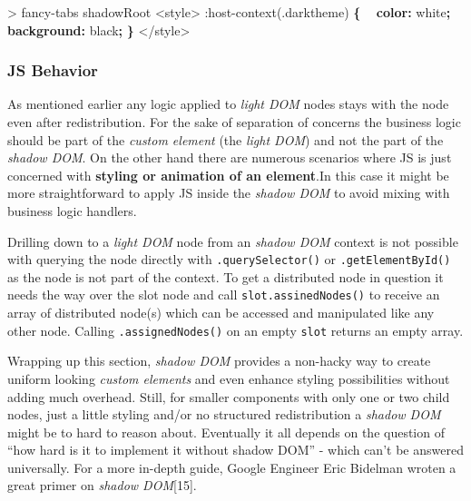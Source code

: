 \documentclass[]{article}
\newenvironment{Shaded}{}{}
\newcommand{\KeywordTok}[1]{\textcolor[rgb]{0.00,0.44,0.13}{\textbf{{#1}}}}
\newcommand{\DataTypeTok}[1]{\textcolor[rgb]{0.56,0.13,0.00}{{#1}}}
\newcommand{\DecValTok}[1]{\textcolor[rgb]{0.25,0.63,0.44}{{#1}}}
\newcommand{\FloatTok}[1]{\textcolor[rgb]{0.25,0.63,0.44}{{#1}}}
\newcommand{\ErrorTok}[1]{\textcolor[rgb]{1.00,0.00,0.00}{\textbf{{#1}}}}
\newcommand{\NormalTok}[1]{{#1}}
\begin{document}
\begin{Shaded}
\begin{Highlighting}[]
\NormalTok{> fancy-tabs shadowRoot}
\NormalTok{<style>}
\DecValTok{:}\NormalTok{host-context(}\FloatTok{.darktheme}\NormalTok{) }\KeywordTok{\{}
\ErrorTok{ } \KeywordTok{color:} \DataTypeTok{white}\KeywordTok{;}
\ErrorTok{ } \KeywordTok{background:} \DataTypeTok{black}\KeywordTok{;}
\KeywordTok{\}}
\NormalTok{</style>}
\end{Highlighting}
\end{Shaded}

\subsubsection{JS Behavior}\label{js-behavior}

As mentioned earlier any logic applied to \emph{light DOM} nodes stays
with the node even after redistribution. For the sake of separation of
concerns the business logic should be part of the \emph{custom element}
(the \emph{light DOM}) and not the part of the \emph{shadow DOM}. On the
other hand there are numerous scenarios where JS is just concerned with
\textbf{styling or animation of an element}.In this case it might be
more straightforward to apply JS inside the \emph{shadow DOM} to avoid
mixing with business logic handlers.

Drilling down to a \emph{light DOM} node from an \emph{shadow DOM}
context is not possible with querying the node directly with
\texttt{.querySelector()} or \texttt{.getElementById()} as the node is
not part of the context. To get a distributed node in question it needs
the way over the slot node and call \texttt{slot.assinedNodes()} to
receive an array of distributed node(s) which can be accessed and
manipulated like any other node. Calling \texttt{.assignedNodes()} on an
empty \texttt{slot} returns an empty array.

Wrapping up this section, \emph{shadow DOM} provides a non-hacky way to
create uniform looking \emph{custom elements} and even enhance styling
possibilities without adding much overhead. Still, for smaller
components with only one or two child nodes, just a little styling
and/or no structured redistribution a \emph{shadow DOM} might be to hard
to reason about. Eventually it all depends on the question of ``how hard
is it to implement it without shadow DOM'' - which can't be answered
universally. For a more in-depth guide, Google Engineer Eric Bidelman
wroten a great primer on \emph{shadow DOM}{[}15{]}.
\end{document}

